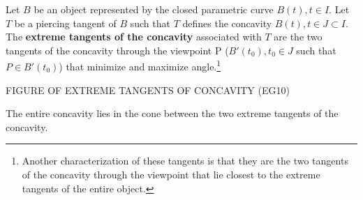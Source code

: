 \documentclass[12pt]{article}
\begin{document}

\begin{defn2}
Let $B$ be an object represented by the closed parametric curve $B(t), t \in I$.
Let $T$ be a piercing tangent of $B$
such that $T$ defines the concavity $B(t), t \in J \subset I$.
The {\bf extreme tangents of the concavity} associated with $T$ 
are the two tangents of the concavity 
through the viewpoint P ($B'(t_0), t_0 \in J$ such that $P \in B'(t_0)$)
that minimize and maximize angle.\footnote{Another characterization of these tangents
  is that they are the two tangents of the concavity through the viewpoint
  that lie closest to the extreme tangents of the entire object.}
\end{defn2}


FIGURE OF EXTREME TANGENTS OF CONCAVITY (EG10)

The entire concavity lies in the cone between the two extreme tangents
of the concavity.


\end{document}
